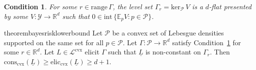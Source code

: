 \documentclass{article} %
\newcommand{\Comments}{0}
\newcommand{\mytodo}[2]{\ifnum\Comments=1%
	\todo[linecolor=#1!80!black,backgroundcolor=#1,bordercolor=#1!80!black]{#2}\fi}
\newcommand{\btw}[1]{}%
\newcommand{\reals}{\mathbb{R}}
\newcommand{\simplex}{\Delta_\Y}
\newcommand{\interior}{\mathrm{int}\,}
\newcommand{\prop}[2][\mathcal{P}]{\mathrm{prop}_{#1}[#2]}
\newcommand{\eliccvx}{\mathrm{elic}_\mathrm{cvx}}
\newcommand{\conscvx}{\mathrm{cons}_\mathrm{cvx}}
\newcommand{\range}{\mathrm{range}\,}
\newcommand{\zeros}[1]{\mathrm{ker}_\P\,#1}
\newcommand{\affhull}{\mathrm{affhull}}
\newcommand{\E}{\mathbb{E}}
\newcommand{\Lcvx}{\mathcal{L}^{\mathrm{cvx}}}
\newcommand{\R}{\mathcal{R}}
\renewcommand{\P}{\mathcal{P}}
\newcommand{\Y}{\mathcal{Y}}
\newcommand{\lbar}{\underline{L}} %
\newcommand{\iden}{\mathrm{iden}}
\newtheorem{definition}{Definition}
\newtheorem{condition}{Condition}
\begin{document}

\begin{condition}\label{cond:v-interior}
  For some $r\in\range\Gamma$, the level set $\Gamma_r = \zeros{V}$ is a $d$-flat presented by some $V:\Y\to\reals^d$ such that \btw{I think we only need $\Gamma_r \subseteq \zeros{V}$.  I think I'll update the proof at some point to reflect this, since it actually gets a bit easier to follow.} $0\in\interior\{\E_pV : p\in\P\}$.
\end{condition}


\begin{restatable}{theorem}{bayesrisklowerbound}\label{thm:bayes-risk-lower-bound}
  Let $\P$ be a convex set of Lebesgue densities supported on the same set for all $p \in \P$.
  Let $\Gamma:\P\to\reals^d$ satisfy Condition~\ref{cond:v-interior} for some $r\in\reals^d$.
  Let $L \in \Lcvx$ elicit $\Gamma$ such that $\lbar$ is non-constant on $\Gamma_r$.
  Then $\conscvx(\lbar) \geq \eliccvx(\lbar) \geq d+1$.
\end{restatable}

\end{document}
